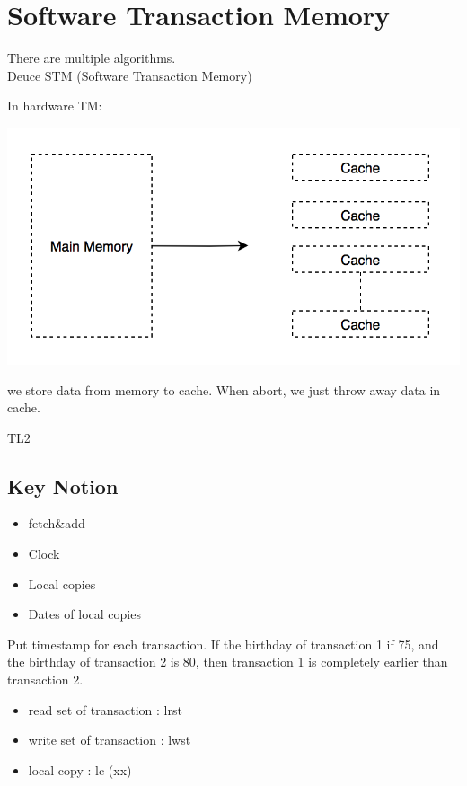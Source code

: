 \documentclass[twoside]{article}
\begin{document}
	
	\section{Software Transaction Memory}
	There are multiple algorithms.\\
	Deuce STM (Software Transaction Memory)
	
	In hardware TM:
	\begin{center}
		\includegraphics[scale=0.7]{cache.png}
	\end{center}
	we store data from memory to cache. When abort, we just throw away data in cache.
	
	TL2
	\subsection {Key Notion}

	\begin{itemize}
		\item fetch\&add
		\item Clock
		\item Local copies
		\item Dates of local copies
	\end{itemize}

	Put timestamp for each transaction. If the birthday of transaction 1 if 75, and the birthday of transaction 2 is 80, then transaction 1 is completely earlier than transaction 2.

	\begin{itemize}
		\item read set of transaction : lrst
		\item write set of transaction : lwst
		\item local copy : lc (xx)
	\end{itemize}
	
	
	
\end{document}
